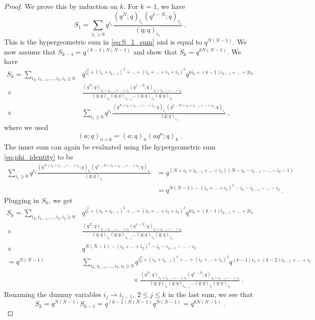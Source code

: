 \documentclass[10pt,a4paper]{amsart}
\begin{document}
\begin{proof}
We prove this by induction on $k$. For $k=1$, we have 
\begin{equation}
    S_1=\sum_{i_1\geq 0}q^{i_1}\frac{(q^N;q)_{i_1}(q^{1-N};q)_{i_1}}{(q;q)_{i_1}}~.
\end{equation}
This is the hypergeometric sum in \eqref{eq:S_1_sum} and is equal to $q^{N(N-1)}$. We now assume that $S_{k-1}=q^{(k-1)N(N-1)}$ and show that $S_{k}=q^{kN(N-1)}$. We have 
\begin{equation}
\begin{split}
    S_k=\sum_{i_k,i_{k-1},\dots,i_3,i_2\geq 0}&q^{i_k^2+(i_k+i_{k-1})^2+\dots+(i_k+\dots+i_3+i_2)^2}q^{ki_k+(k-1)i_{k-1}+\dots+2i_2}
    \\
    \times&\frac{(q^N;q)_{i_k+i_{k-1}+\dots +i_2}(q^{1-N};q)_{i_k+i_{k-1}+\dots +i_2}}{(q;q)_{i_k}(q;q)_{i_{k-1}}\dots (q;q)_{i_3}(q;q)_{i_2}}
    \\
    \times&\sum_{i_1\geq 0}q^{i_1}\frac{(q^{N+i_k+i_{k-1}+\dots+i_2};q)_{i_1}(q^{1-N+i_k+i_{k-1}+\dots+i_2};q)_{i_1}}{(q;q)_{i_1}}~,
\end{split}    
\end{equation}
where we used 
\begin{equation}
    (a;q)_{n+k}=(a;q)_n(aq^n;q)_k~.
\end{equation}
The inner sum can again be evaluated using the hypergeometric sum \eqref{eq:phi_identity} to be
\begin{equation}
\begin{split}
\sum_{i_1\geq 0}q^{i_1}\frac{(q^{N+i_k+i_{k-1}+\dots+i_2};q)_{i_1}(q^{1-N+i_k+i_{k-1}+\dots+i_2};q)_{i_1}}{(q;q)_{i_1}}&=q^{(N+i_k+i_{k-1}+\dots+i_2)(N-i_k-i_{k-1}-\dots-i_2-1)}
\\
&=q^{N(N-1)-(i_k+\dots+i_2)^2-i_k-i_{k-1}-\dots-i_2}~.
\end{split}
\end{equation}
Plugging in $S_k$, we get 
\begin{equation}
\begin{split}
    S_k=\sum_{i_k,i_{k-1},\dots,i_3,i_2\geq 0}&q^{i_k^2+(i_k+i_{k-1})^2+\dots+(i_k+\dots+i_3+i_2)^2}q^{ki_k+(k-1)i_{k-1}+\dots+2i_2}
    \\
    \times&\frac{(q^N;q)_{i_k+i_{k-1}+\dots +i_2}(q^{1-N};q)_{i_k+i_{k-1}+\dots +i_2}}{(q;q)_{i_k}(q;q)_{i_{k-1}}\dots (q;q)_{i_3}(q;q)_{i_2}}
    \\
    \times&q^{N(N-1)-(i_k+\dots+i_2)^2-i_k-i_{k-1}-\dots-i_2}
    \\
    =q^{N(N-1)}&\sum_{i_k,i_{k-1},\dots,i_3,i_2\geq 0}q^{i_k^2+(i_k+i_{k-1})^2+\dots+(i_k+\dots+i_3)^2}q^{(k-1)i_k+(k-2)i_{k-1}+\dots+i_2}
    \\
    &\hspace{3cm}\times\frac{(q^N;q)_{i_k+i_{k-1}+\dots +i_2}(q^{1-N};q)_{i_k+i_{k-1}+\dots +i_2}}{(q;q)_{i_k}(q;q)_{i_{k-1}}\dots (q;q)_{i_3}(q;q)_{i_2}}~.
\end{split}    
\end{equation}
Renaming the dummy variables $i_j\to i_{j-1},~2\leq j\leq k$ in the last sum, we see that
\begin{equation}
    S_k=q^{N(N-1)}S_{k-1}=q^{(k-1)N(N-1)}q^{N(N-1)}=q^{kN(N-1)}~.
\end{equation}
\end{proof}
\end{document}
